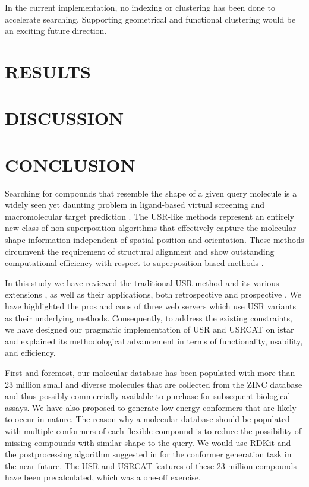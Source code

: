 \documentclass[a4,center,fleqn]{NAR}
\begin{document}
In the current implementation, no indexing or clustering has been done to accelerate searching. Supporting geometrical and functional clustering would be an exciting future direction.

\section{RESULTS}



\section{DISCUSSION}



\section{CONCLUSION}

Searching for compounds that resemble the shape of a given query molecule is a widely seen yet daunting problem in ligand-based virtual screening \cite{1332,1380,1281,1504,1502,1615} and macromolecular target prediction \cite{1407,1408,1402}. The USR-like methods \cite{1379,1338,1331} represent an entirely new class of non-superposition algorithms that effectively capture the molecular shape information independent of spatial position and orientation. These methods circumvent the requirement of structural alignment and show outstanding computational efficiency with respect to superposition-based methods \cite{1440,887,1439}.

In this study we have reviewed the traditional USR method \cite{1379} and its various extensions \cite{1333,1436,1437,1334,1335,1337,1338,1331,1407,1408,1675}, as well as their applications, both retrospective \cite{1332,1331} and prospective \cite{1505,1380,1281,1504,1502,1615}. We have highlighted the pros and cons of three web servers \cite{1436,1437,1408} which use USR variants as their underlying methods. Consequently, to address the existing constraints, we have designed our pragmatic implementation of USR \cite{1379} and USRCAT \cite{1331} on istar \cite{1362} and explained its methodological advancement in terms of functionality, usability, and efficiency.

First and foremost, our molecular database has been populated with more than 23 million small and diverse molecules that are collected from the ZINC database \cite{532,1178} and thus possibly commercially available to purchase for subsequent biological assays. We have also proposed to generate low-energy conformers that are likely to occur in nature. The reason why a molecular database should be populated with multiple conformers of each flexible compound is to reduce the possibility of missing compounds with similar shape to the query. We would use RDKit and the postprocessing algorithm suggested in \cite{1127} for the conformer generation task in the near future. The USR and USRCAT features of these 23 million compounds have been precalculated, which was a one-off exercise.
\end{document}
